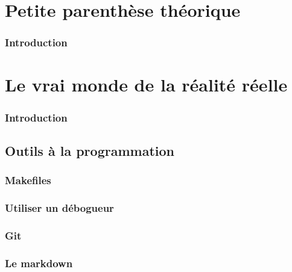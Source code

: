 \documentclass{minitelreport}
\begin{document}
\begin{refsection}
\part{Petite parenthèse théorique}
\label{part:petite_parenthèse_théorique}
	\section*{Introduction}
	
\part{Le vrai monde de la réalité réelle}
\label{part:le_vrai_monde_de_la_réalité_réelle}
	\section*{Introduction}
	
	\chapter{Outils à la programmation}
	\label{chap:outils}
		\section{Makefiles}
			\label{sec:makefiles}
			
		\section{Utiliser un débogueur}
			\label{sec:utiliser_un_d_bogueur}
			
		\section{Git}
			\label{sec:git}
			
		\section{Le markdown}
			\label{sec:le_markdown}
			

\end{refsection}
\end{document}

